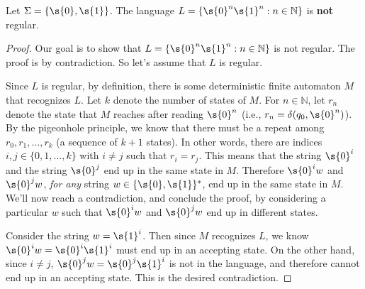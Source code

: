 \begin{flex}
\begin{theorem} \label{theorem:0n1n-is-not-regular}
Let $\Sigma = \{\s{0},\s{1}\}$. The language $L = \{\s{0}^n \s{1}^n: n \in \mathbb{N}\}$ is \textbf{not} regular.
\end{theorem}

\begin{proof}
Our goal is to show that $L = \{\s{0}^n \s{1}^n: n \in \mathbb{N}\}$ is not regular. The proof is by contradiction. So let's assume that $L$ is regular. 

Since $L$ is regular, by definition, there is some deterministic finite automaton $M$ that recognizes $L$. Let $k$ denote the number of states of $M$. For $n \in \mathbb{N}$, let $r_n$ denote the state that $M$ reaches after reading $\s{0}^n$ (i.e., $r_n = \delta(q_0, \s{0}^n)$). By the pigeonhole principle, we know that there must be a repeat among $r_0, r_1,\ldots, r_k$ (a sequence of $k+1$ states). In other words, there are indices $i, j \in \{0,1,\ldots,k\}$ with $i \neq j$ such that $r_i = r_j$. This means that the string $\s{0}^i$ and the string $\s{0}^j$ end up in the same state in $M$. Therefore $\s{0}^iw$ and $\s{0}^jw$, \emph{for any} string $w \in \{\s{0},\s{1}\}^*$, end up in the same state in $M$. We'll now reach a contradiction, and conclude the proof, by considering a particular $w$ such that $\s{0}^iw$ and $\s{0}^jw$ end up in different states. 

Consider the string $w = \s{1}^i$. Then since $M$ recognizes $L$, we know $\s{0}^iw = \s{0}^i\s{1}^i$ must end up in an accepting state. On the other hand, since $i \neq j$, $\s{0}^jw = \s{0}^j\s{1}^i$ is not in the language, and therefore cannot end up in an accepting state. This is the desired contradiction.
\end{proof}
\end{flex}


